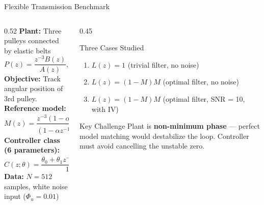 \documentclass[hyperref={pdfpagemode=FullScreen},aspectratio=169]{beamer}
\begin{document}
\begin{frame}{Flexible Transmission Benchmark}
  \begin{columns}[T]
    \begin{column}{0.52\textwidth}
      \textbf{Plant:} Three pulleys connected by elastic belts
      \[
        P(z) = \frac{z^{-3}B(z)}{A(z)}, \quad T_s = 0.05\,\text{s}
      \]
      \textbf{Objective:} Track angular position of 3rd pulley.\\
      \textbf{Reference model:}
      \[
        M(z) = \frac{z^{-3}(1-\alpha)^2}{(1-\alpha z^{-1})^2}, \quad \alpha = e^{-T_s \omega_0}
      \]
      \textbf{Controller class (6 parameters):}
      \[
        C(z;\theta) = \frac{\theta_0 + \theta_1 z^{-1}+\cdots+\theta_5 z^{-5}}{1-z^{-1}}
      \]
      \textbf{Data:} $N=512$ samples, white noise input ($\Phi_u=0.01$)
    \end{column}
    \begin{column}{0.45\textwidth}
      \begin{block}{Three Cases Studied}
        \begin{enumerate}
          \item $L(z)=1$ (trivial filter, no noise)
          \item $L(z) = (1-M)M$ (optimal filter, no noise)
          \item $L(z) = (1-M)M$ (optimal filter, SNR = 10, with IV)
        \end{enumerate}
      \end{block}
      \vspace{0.4em}
      \begin{alertblock}{Key Challenge}
        Plant is \textbf{non-minimum phase} --- perfect model matching would destabilize the loop. Controller must avoid cancelling the unstable zero.
      \end{alertblock}
    \end{column}
  \end{columns}
\end{frame}
\end{document}
